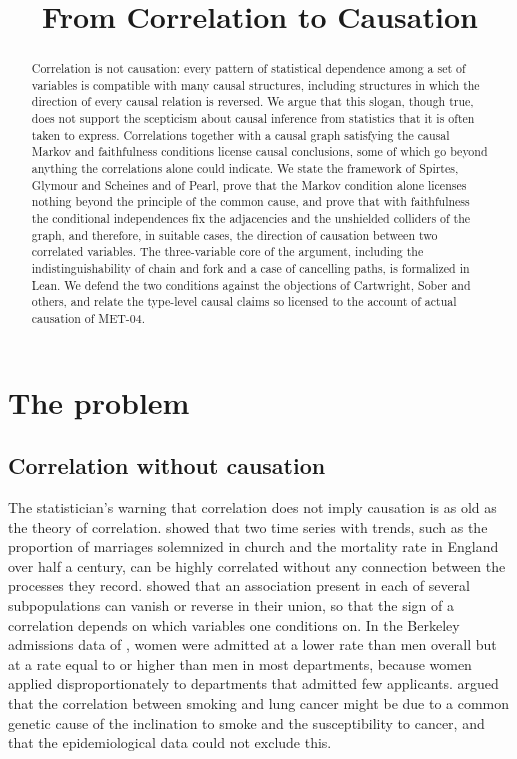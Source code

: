 \documentclass{situationist-preprint}
\title{From Correlation to Causation}
\begin{document}
\maketitle

\begin{abstract}
Correlation is not causation: every pattern of statistical dependence among a set of variables is compatible with many causal structures, including structures in which the direction of every causal relation is reversed. We argue that this slogan, though true, does not support the scepticism about causal inference from statistics that it is often taken to express. Correlations together with a causal graph satisfying the causal Markov and faithfulness conditions license causal conclusions, some of which go beyond anything the correlations alone could indicate. We state the framework of Spirtes, Glymour and Scheines and of Pearl, prove that the Markov condition alone licenses nothing beyond the principle of the common cause, and prove that with faithfulness the conditional independences fix the adjacencies and the unshielded colliders of the graph, and therefore, in suitable cases, the direction of causation between two correlated variables. The three-variable core of the argument, including the indistinguishability of chain and fork and a case of cancelling paths, is formalized in Lean. We defend the two conditions against the objections of Cartwright, Sober and others, and relate the type-level causal claims so licensed to the account of actual causation of MET-04.
\end{abstract}

\section{The problem}\label{s:problem}

\subsection{Correlation without causation}

The statistician's warning that correlation does not imply causation is as old as the theory of correlation. \citet{Yule1926} showed that two time series with trends, such as the proportion of marriages solemnized in church and the mortality rate in England over half a century, can be highly correlated without any connection between the processes they record. \citet{Simpson1951} showed that an association present in each of several subpopulations can vanish or reverse in their union, so that the sign of a correlation depends on which variables one conditions on. In the Berkeley admissions data of \citet{Bickel1975}, women were admitted at a lower rate than men overall but at a rate equal to or higher than men in most departments, because women applied disproportionately to departments that admitted few applicants. \citet{Fisher1958} argued that the correlation between smoking and lung cancer might be due to a common genetic cause of the inclination to smoke and the susceptibility to cancer, and that the epidemiological data could not exclude this.
\end{document}
